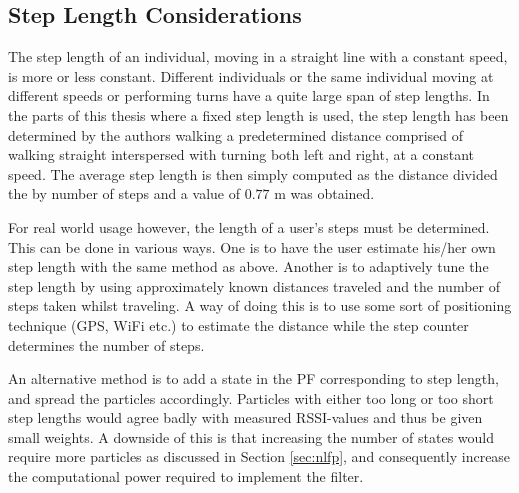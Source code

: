 \documentclass{LTHthesis}
\begin{document}
\subsection{Step Length Considerations}
\label{subsec:step_len}
%
The step length of an individual, moving in a straight line with a constant speed, is more or less constant. Different individuals or the same individual moving at different speeds or performing turns have a quite large span of step lengths. In the parts of this thesis where a fixed step length is used, the step length has been determined by the authors walking a predetermined distance comprised of walking straight interspersed with turning both left and right, at a constant speed. The average step length is then simply computed as the distance divided the by number of steps and a value of $0.77$ m was obtained.  

For real world usage however, the length of a user's steps must be determined. This can be done in various ways. One is to have the user estimate his/her own step length with the same method as above. Another is to adaptively tune the step length by using approximately known distances traveled and the number of steps taken whilst traveling. A way of doing this is to use some sort of positioning technique (GPS, WiFi etc.) to estimate the distance while the step counter determines the number of steps.

An alternative method is to add a state in the PF corresponding to step length, and spread the particles accordingly. Particles with either too long or too short step lengths would agree badly with measured RSSI-values and thus be given small weights. A downside of this is that increasing the number of states would require more particles as discussed in Section \ref{sec:nlfp}, and consequently increase the computational power required to implement the filter.      
%
\end{document}
